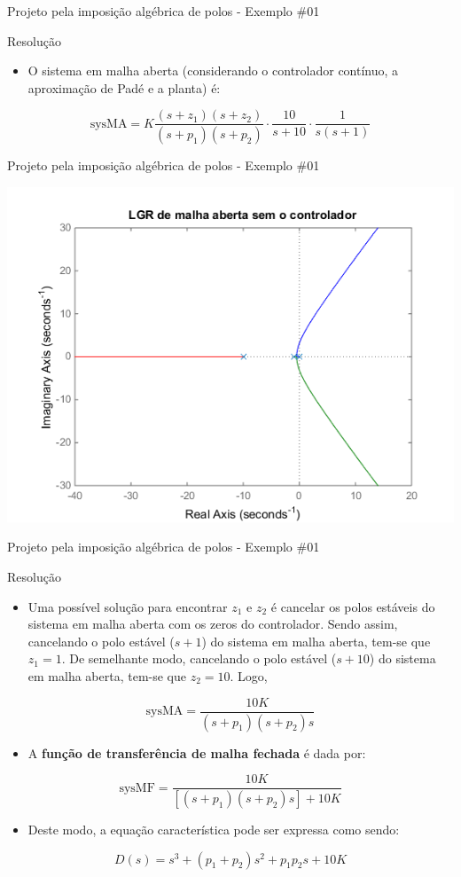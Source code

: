 \begin{frame}{Projeto pela imposição algébrica de polos - Exemplo \#01}
\begin{block}{Resolução}
\begin{itemize}
    \item O sistema em malha aberta (considerando o controlador contínuo, a aproximação de Padé e a planta) é:
\end{itemize}
	\[\text{sysMA}=K\dfrac{(s+z_1)(s+z_2)}{(s+p_1)(s+p_2)}\cdot\dfrac{10}{s+10}\cdot\dfrac{1}{s(s+1)} \]
\end{block}
\end{frame}

\begin{frame}{Projeto pela imposição algébrica de polos - Exemplo \#01}
\centerline{\includegraphics[width=0.8\linewidth]{Figuras/Ch10/fig4.png}}
\end{frame}


\begin{frame}{Projeto pela imposição algébrica de polos - Exemplo \#01}
	\begin{block}{Resolução}
\begin{itemize}
    \item Uma possível solução para encontrar $z_1$ e $z_2$ é cancelar os polos estáveis do sistema em malha aberta com os zeros do controlador. Sendo assim, cancelando o polo estável ($ s+1 $) do sistema em malha aberta, tem-se que $ z_1=1 $. De semelhante modo, cancelando o polo estável ($ s+10 $) do sistema em malha aberta, tem-se que $ z_2=10 $. Logo,
\end{itemize}
	\[ \text{sysMA}=\frac{10K}{(s+p_1)(s+p_2)s} \]
\begin{itemize}
\vspace{-0.2cm}
    \item A \textbf{função de transferência de malha fechada} é dada por:
\end{itemize}		
		\[ \text{sysMF}=\dfrac{10K}{[(s+p_1)(s+p_2)s]+10K} \]
\begin{itemize}
\vspace{-0.2cm}
    \item Deste modo, a equação característica pode ser expressa como sendo:
\end{itemize}
\[  D(s)=s^{3}+(p_1+p_2)s^{2}+p_1p_2s+10K \]
	\end{block}
\end{frame}


